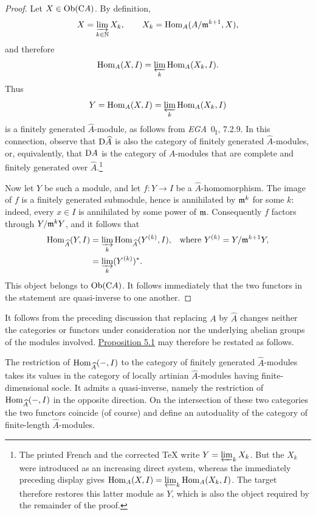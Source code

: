 \begin{proof}
Let $X\in\operatorname{Ob}(\mathrm C A)$. By definition,
\[
  X=\varinjlim_{k\in\mathbb N}X_k,
  \qquad
  X_k=\operatorname{Hom}_A(A/\mathfrak m^{k+1},X),
\]
and therefore
\[
  \operatorname{Hom}_A(X,I)=\varprojlim_k\operatorname{Hom}_A(X_k,I).
\]
Thus
\[
  Y=\operatorname{Hom}_A(X,I)=\varprojlim_k\operatorname{Hom}_A(X_k,I)
\]
is a finitely generated $\widehat A$-module, as follows from
\emph{EGA}~$0_{\mathrm I}$, 7.2.9. In this connection, observe that $\mathrm D\widehat A$
is also the category of finitely generated $\widehat A$-modules, or,
equivalently, that $\mathrm D A$ is the category of $A$-modules that are complete and
finitely generated over $\widehat A$.\footnote{The printed French and the
corrected TeX write $Y=\varprojlim_k X_k$.  But the $X_k$ were introduced as
an increasing direct system, whereas the immediately preceding display gives
$\operatorname{Hom}_A(X,I)=\varprojlim_k\operatorname{Hom}_A(X_k,I)$.  The target therefore restores
this latter module as $Y$, which is also the object required by the remainder
of the proof.}

Now let $Y$ be such a module, and let $f\colon Y\to I$ be a
$\widehat A$-homomorphism. The image of $f$ is a finitely generated
submodule, hence is annihilated by $\mathfrak m^k$ for some $k$: indeed, every
$x\in I$ is annihilated by some power of $\mathfrak m$. Consequently $f$ factors
through $Y/\mathfrak m^kY$, and it follows that
\begin{align*}
  \operatorname{Hom}_{\widehat A}(Y,I)
    &=\varinjlim_k\operatorname{Hom}_{\widehat A}(Y^{(k)},I),
      &\text{where }Y^{(k)}&=Y/\mathfrak m^{k+1}Y,\\
    &=\varinjlim_k (Y^{(k)})^*.
\end{align*}
This object belongs to $\operatorname{Ob}(\mathrm C A)$. It follows immediately that
the two functors in the statement are quasi-inverse to one another.
\end{proof}


It follows from the preceding discussion that replacing $A$ by $\widehat A$
changes neither the categories or functors under consideration nor the
underlying abelian groups of the modules involved. \hyperref[IV.5.1]{Proposition 5.1} may
therefore be restated as follows.

The restriction of $\operatorname{Hom}_{\widehat A}(-,I)$ to the category of finitely
generated $\widehat A$-modules takes its values in the category of locally
artinian $\widehat A$-modules having finite-dimensional socle. It admits a
quasi-inverse, namely the restriction of $\operatorname{Hom}_{\widehat A}(-,I)$ in the
opposite direction. On the intersection of these two categories the two
functors coincide (of course) and define an autoduality of the category of
finite-length $\widehat A$-modules.

